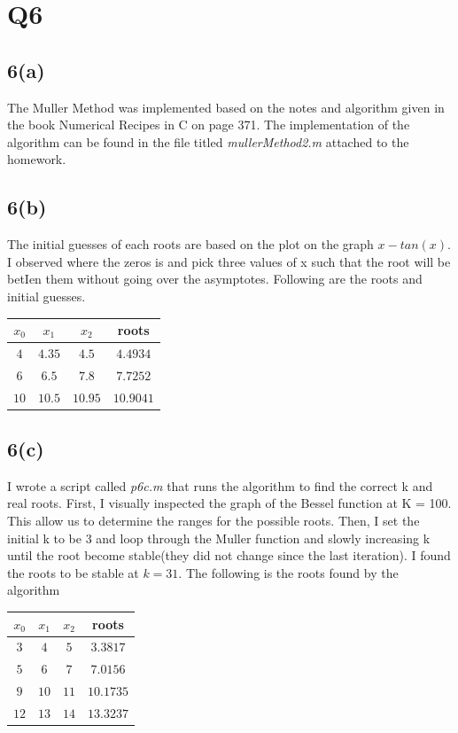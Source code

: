 \documentclass{article}
\begin{document}
\section{Q6}
\subsection*{6(a)}
The Muller Method was implemented based on the notes and algorithm given in the book Numerical Recipes in C on page 371. The implementation of the algorithm can be found in the file titled \textit{mullerMethod2.m} attached to the homework.
\subsection*{6(b)}
The initial guesses of each roots are based on the plot on the graph $x -tan(x)$. I observed where the zeros is and pick three values of x such that the root will be betIen them without going over the asymptotes. Following are the roots and initial guesses.\\

\begin{tabular}{|c|c|c|c|}
\hline
$x_0$ & $x_1$ & $x_2$ & roots \\ \hline
$4$ & $4.35$ & $4.5$ & $4.4934$ \\ \hline
$6$ & $6.5$ & $7.8$ & $7.7252$ \\ \hline
$10$ & $10.5$ & $10.95$ & $10.9041$ \\ \hline
\end{tabular}
\subsection*{6(c)}
I wrote a script called \textit{p6c.m} that runs the algorithm to find the correct k and real roots. First, I visually inspected the graph of the Bessel function at K = 100. This allow us to determine the ranges for the possible roots. Then, I set the initial k to be 3 and loop through the Muller function and slowly increasing k until the root become stable(they did not change since the last iteration). I found the roots to be stable at $k = 31$. The following is the roots found by the algorithm\\

\begin{tabular}{|c|c|c|c|}
\hline
$x_0$ & $x_1$ & $x_2$ & roots \\ \hline
$3$ & $4$ & $5$ & $3.3817$ \\ \hline
$5$ & $6$ & $7$ & $7.0156$ \\ \hline
$9$ & $10$ & $11$ & $10.1735$ \\ \hline
$12$ & $13$ & $14$ & $13.3237$ \\ \hline
\end{tabular}
\end{document}
